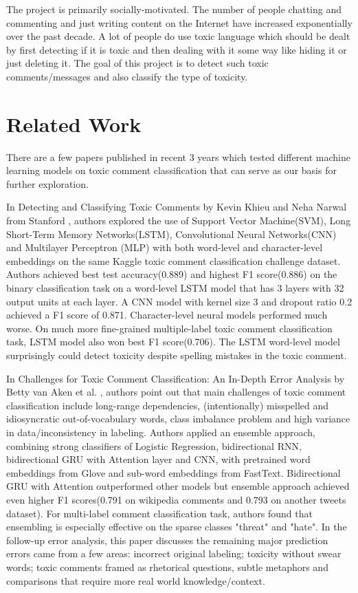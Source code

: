 \documentclass[sigconf]{acmart}
\begin{document}
The project is primarily socially-motivated. The number of people chatting and commenting and just writing content on the Internet have increased exponentially over the past decade. A lot of people do use toxic language which should be dealt by first detecting if it is toxic and then dealing with it some way like hiding it or just deleting it. The goal of this project is to detect such toxic comments/messages and also classify the type of toxicity.

\section{Related Work}

There are a few papers published in recent 3 years which tested different machine learning models on toxic comment classification that can serve as our basis for further exploration.

In Detecting and Classifying Toxic Comments by Kevin Khieu and Neha Narwal  from Stanford \cite{khieudetecting} , authors explored the use of Support Vector Machine(SVM), Long Short-Term Memory Networks(LSTM), Convolutional Neural Networks(CNN) and Multilayer Perceptron (MLP) with both word-level and character-level embeddings on the same Kaggle toxic comment classification challenge dataset. Authors achieved best test accuracy(0.889) and highest F1 score(0.886) on the binary classification task on a word-level LSTM model that has 3 layers with 32 output units at each layer. A CNN model with kernel size 3 and dropout ratio 0.2 achieved a F1 score of 0.871. Character-level neural models performed much worse. On much more fine-grained multiple-label toxic comment classification task, LSTM model also won best F1 score(0.706). The LSTM word-level model surprisingly could detect toxicity despite spelling mistakes in the toxic comment.

In Challenges for Toxic Comment Classification: An In-Depth Error Analysis by Betty van Aken et al. \cite{van2018challenges}, authors point out that main challenges of toxic comment classification include long-range dependencies, (intentionally) misspelled and idiosyncratic out-of-vocabulary words, class imbalance problem and high variance in data/inconsistency in labeling. Authors applied an ensemble approach, combining strong classifiers of Logistic Regression, bidirectional RNN, bidirectional GRU with Attention layer and CNN, with pretrained word embeddings from Glove and sub-word embeddings from FastText. Bidirectional GRU with Attention outperformed other models but ensemble approach achieved even higher F1 scores(0.791 on wikipedia comments and 0.793 on another tweets dataset). For multi-label comment classification task, authors found that ensembling is especially effective on the sparse classes "threat" and "hate". In the follow-up error analysis, this paper discusses the remaining major prediction errors came from a few areas: incorrect original labeling; toxicity without swear words; toxic comments framed as rhetorical questions, subtle metaphors and comparisons that require more real world knowledge/context.
\end{document}
